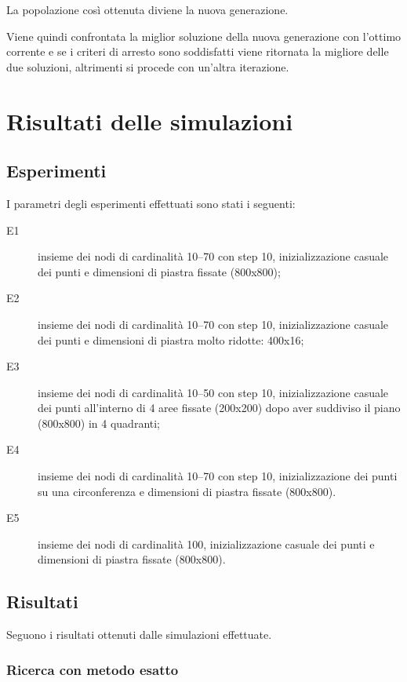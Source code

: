 \documentclass[a4paper]{article}
\begin{document}
            La popolazione cos\`i ottenuta diviene la nuova generazione.
            
            Viene quindi confrontata la miglior soluzione della nuova generazione con l'ottimo corrente e se i criteri di arresto sono soddisfatti viene ritornata la migliore delle due soluzioni,
            altrimenti si procede con un'altra iterazione.
\newpage
    \section{Risultati delle simulazioni}
        
        \subsection{Esperimenti}
        I parametri degli esperimenti effettuati sono stati i seguenti:
        \begin{description}
            \item[E1] insieme dei nodi di cardinalit\`a 10--70 con step 10, inizializzazione casuale dei punti e dimensioni di piastra fissate (800x800);
            \item[E2] insieme dei nodi di cardinalit\`a 10--70 con step 10, inizializzazione casuale dei punti e dimensioni di piastra molto ridotte: 400x16;
            \item[E3] insieme dei nodi di cardinalit\`a 10--50 con step 10, inizializzazione casuale dei punti all'interno di 4 aree fissate (200x200) dopo aver suddiviso il piano (800x800) in 4 quadranti;
            \item[E4] insieme dei nodi di cardinalit\`a 10--70 con step 10, inizializzazione dei punti su una circonferenza e dimensioni di piastra fissate (800x800).
            \item[E5] insieme dei nodi di cardinalit\`a 100, inizializzazione casuale dei punti e dimensioni di piastra fissate (800x800).
        \end{description}

        \subsection{Risultati}
            Seguono i risultati ottenuti dalle simulazioni effettuate.
            \subsubsection{Ricerca con metodo esatto}
\end{document}
